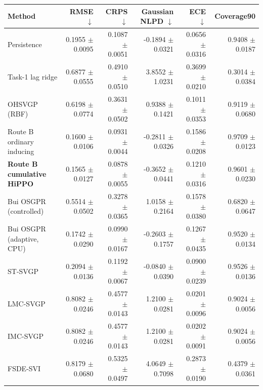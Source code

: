 \begin{tabular}{lrrrrr}
\toprule
Method & RMSE $\downarrow$ & CRPS $\downarrow$ & Gaussian NLPD $\downarrow$ & ECE $\downarrow$ & Coverage90 \\ 
\midrule
Persistence & 0.1955 $\pm$ 0.0095 & 0.1087 $\pm$ 0.0051 & -0.1894 $\pm$ 0.0321 & 0.0656 $\pm$ 0.0316 & 0.9408 $\pm$ 0.0187 \\ 
Task-1 lag ridge & 0.6877 $\pm$ 0.0555 & 0.4910 $\pm$ 0.0510 & 3.8552 $\pm$ 1.0231 & 0.3699 $\pm$ 0.0210 & 0.3014 $\pm$ 0.0384 \\ 
OHSVGP (RBF) & 0.6198 $\pm$ 0.0774 & 0.3631 $\pm$ 0.0502 & 0.9388 $\pm$ 0.1421 & 0.1011 $\pm$ 0.0353 & 0.9119 $\pm$ 0.0680 \\ 
Route B ordinary inducing & 0.1600 $\pm$ 0.0106 & 0.0931 $\pm$ 0.0044 & -0.2811 $\pm$ 0.0326 & 0.1586 $\pm$ 0.0208 & 0.9709 $\pm$ 0.0123 \\ 
\textbf{Route B cumulative HiPPO} & 0.1565 $\pm$ 0.0127 & 0.0878 $\pm$ 0.0055 & -0.3652 $\pm$ 0.0441 & 0.1210 $\pm$ 0.0316 & 0.9601 $\pm$ 0.0230 \\ 
Bui OSGPR (controlled) & 0.5514 $\pm$ 0.0502 & 0.3278 $\pm$ 0.0365 & 1.0158 $\pm$ 0.2164 & 0.1578 $\pm$ 0.0380 & 0.6820 $\pm$ 0.0647 \\ 
Bui OSGPR (adaptive, CPU) & 0.1742 $\pm$ 0.0290 & 0.0990 $\pm$ 0.0167 & -0.2603 $\pm$ 0.1757 & 0.1267 $\pm$ 0.0435 & 0.9520 $\pm$ 0.0134 \\ 
ST-SVGP & 0.2094 $\pm$ 0.0136 & 0.1192 $\pm$ 0.0067 & -0.0840 $\pm$ 0.0390 & 0.0900 $\pm$ 0.0239 & 0.9526 $\pm$ 0.0136 \\ 
LMC-SVGP & 0.8082 $\pm$ 0.0246 & 0.4577 $\pm$ 0.0143 & 1.2100 $\pm$ 0.0281 & 0.0201 $\pm$ 0.0096 & 0.9024 $\pm$ 0.0056 \\ 
IMC-SVGP & 0.8082 $\pm$ 0.0246 & 0.4577 $\pm$ 0.0143 & 1.2100 $\pm$ 0.0281 & 0.0202 $\pm$ 0.0091 & 0.9024 $\pm$ 0.0056 \\ 
FSDE-SVI & 0.8179 $\pm$ 0.0680 & 0.5325 $\pm$ 0.0497 & 4.0649 $\pm$ 0.7098 & 0.2873 $\pm$ 0.0190 & 0.4379 $\pm$ 0.0361 \\ 
\bottomrule
\end{tabular}
